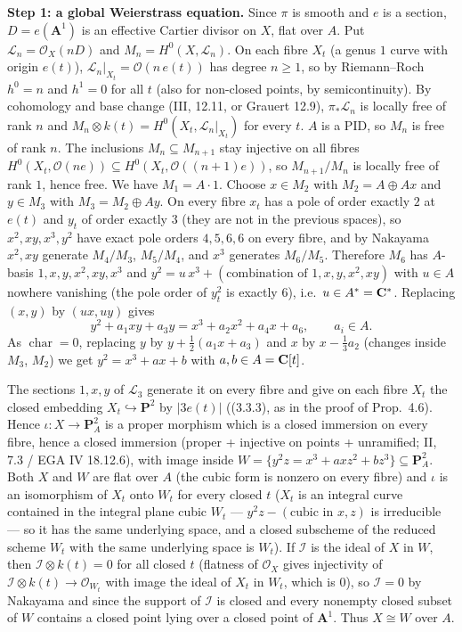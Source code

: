 \documentclass[11pt]{article}
\begin{document}
\textbf{Step 1: a global Weierstrass equation.} Since $\pi$ is smooth and $e$ is a section, $D=e(\mathbf A^1)$ is an effective Cartier divisor on $X$, flat over $A$. Put $\mathcal L_n=\mathcal O_X(nD)$ and $M_n=H^0(X,\mathcal L_n)$. On each fibre $X_t$ (a genus $1$ curve with origin $e(t)$), $\mathcal L_n|_{X_t}=\mathcal O(n\,e(t))$ has degree $n\ge1$, so by Riemann--Roch $h^0=n$ and $h^1=0$ for all $t$ (also for non-closed points, by semicontinuity). By cohomology and base change (III, 12.11, or Grauert 12.9), $\pi_*\mathcal L_n$ is locally free of rank $n$ and $M_n\otimes k(t)=H^0(X_t,\mathcal L_n|_{X_t})$ for every $t$. $A$ is a PID, so $M_n$ is free of rank $n$. The inclusions $M_n\subseteq M_{n+1}$ stay injective on all fibres $H^0(X_t,\mathcal O(ne))\subseteq H^0(X_t,\mathcal O((n+1)e))$, so $M_{n+1}/M_n$ is locally free of rank $1$, hence free. We have $M_1=A\cdot1$. Choose $x\in M_2$ with $M_2=A\oplus Ax$ and $y\in M_3$ with $M_3=M_2\oplus Ay$. On every fibre $x_t$ has a pole of order exactly $2$ at $e(t)$ and $y_t$ of order exactly $3$ (they are not in the previous spaces), so $x^2,xy,x^3,y^2$ have exact pole orders $4,5,6,6$ on every fibre, and by Nakayama $x^2,xy$ generate $M_4/M_3$, $M_5/M_4$, and $x^3$ generates $M_6/M_5$. Therefore $M_6$ has $A$-basis $1,x,y,x^2,xy,x^3$ and $y^2=u\,x^3+(\text{combination of }1,x,y,x^2,xy)$ with $u\in A$ nowhere vanishing (the pole order of $y_t^2$ is exactly $6$), i.e.\ $u\in A^*=\mathbf C^*$. Replacing $(x,y)$ by $(ux,uy)$ gives
\[
y^2+a_1xy+a_3y=x^3+a_2x^2+a_4x+a_6,\qquad a_i\in A.
\]
As $\operatorname{char}=0$, replacing $y$ by $y+\frac12(a_1x+a_3)$ and $x$ by $x-\frac13a_2$ (changes inside $M_3$, $M_2$) we get $y^2=x^3+ax+b$ with $a,b\in A=\mathbf C[t]$.

The sections $1,x,y$ of $\mathcal L_3$ generate it on every fibre and give on each fibre $X_t$ the closed embedding $X_t\hookrightarrow\mathbf P^2$ by $|3e(t)|$ ((3.3.3), as in the proof of Prop.~4.6). Hence $\iota:X\to\mathbf P^2_A$ is a proper morphism which is a closed immersion on every fibre, hence a closed immersion (proper + injective on points + unramified; II, 7.3 / EGA IV 18.12.6), with image inside $W=\{y^2z=x^3+axz^2+bz^3\}\subseteq\mathbf P^2_A$. Both $X$ and $W$ are flat over $A$ (the cubic form is nonzero on every fibre) and $\iota$ is an isomorphism of $X_t$ onto $W_t$ for every closed $t$ ($X_t$ is an integral curve contained in the integral plane cubic $W_t$ --- $y^2z-(\text{cubic in }x,z)$ is irreducible --- so it has the same underlying space, and a closed subscheme of the reduced scheme $W_t$ with the same underlying space is $W_t$). If $\mathcal I$ is the ideal of $X$ in $W$, then $\mathcal I\otimes k(t)=0$ for all closed $t$ (flatness of $\mathcal O_X$ gives injectivity of $\mathcal I\otimes k(t)\to\mathcal O_{W_t}$ with image the ideal of $X_t$ in $W_t$, which is $0$), so $\mathcal I=0$ by Nakayama and since the support of $\mathcal I$ is closed and every nonempty closed subset of $W$ contains a closed point lying over a closed point of $\mathbf A^1$. Thus $X\cong W$ over $A$.
\end{document}
